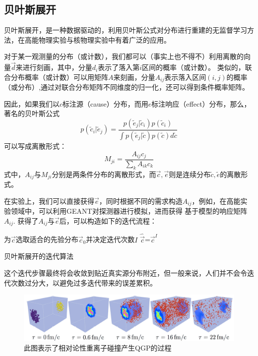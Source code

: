 \documentclass[aps,pre,12pt,preprint,onecolumn,showpacs,showkeys]{revtex4-1}
\begin{document}
\subsection{贝叶斯展开}
贝叶斯展开，是一种数据驱动的，利用贝叶斯公式对分布进行重建的无监督学习方法，在高能物理实验与核物理实验中有着广泛的应用。\par
对于某一观测量的分布（或计数），我们都可以（事实上也不得不）利用离散的向量$\vec{d}$来进行刻画，其中，分量$d_i$表示了落入第$i$区间的概率（或计数）。
类似的，联合分布概率（或计数）可以用矩阵$A$来刻画，分量$A_{ij}$表示落入区间$(i,j)$的概率（或分布）,通过对联合分布矩阵不同维度的归一化，还可以得到条件概率矩阵。\par
因此，如果我们以$c$标注源（cause）分布，而用$e$标注响应（effect）分布，那么，著名的贝叶斯公式
\begin{equation}p(\tilde{c}_i|\tilde{e}_j)=\frac{p(\tilde{e}_j|\tilde{c}_i)p(\tilde{c}_i)}{\int p(\tilde{e}_j|\tilde{c})p(\tilde{c})d\tilde{c}}\end{equation}
可以写成离散形式：
\begin{equation}M_{ji}=\frac{A_{ij}c_j}{\sum_{k}A_{ik}c_k}\end{equation}
式中，$A_{ij}$与$M_{ji}$分别是两条件分布的离散形式，而$\vec{c},\vec{e}$则是连续分布$\tilde{c},\tilde{e}$的离散形式。\par
在实验上，我们可以直接获得$\vec{e}$，同时根据不同的需求构造$A_{ij}$，例如，在高能实验领域中，可以利用GEANT对探测器进行模拟，进而获得
基于模型的响应矩阵$A_{ij}$.
获得了$A_{ij}$与$\vec{e}$后，可以构造如下的迭代流程：\par
\begin{algorithm}
    \SetAlgoLined
    为$\vec{c}$选取适合的先验分布$\vec{c}_0$并决定迭代次数$I$\;
    $\hat{\vec{c}}$=$\vec{c}^{I}$\;
    \caption{贝叶斯展开的迭代算法}
\end{algorithm}
这个迭代步骤最终将会收敛到贴近真实源分布附近，但一般来说，人们并不会令迭代次数过分大，以避免过多迭代带来的误差累积。
\begin{figure}[htbp]
\centering
\includegraphics[width=140mm]{QGP}
\caption{\label{fig:QGP}%
此图表示了相对论性重离子碰撞产生QGP的过程}
\end{figure}
\end{document}
